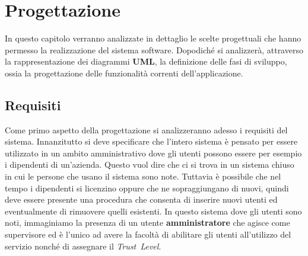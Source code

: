 \def \ti{\textit}
\def \bf{\textbf}

\chapter{Progettazione}
	\label{cap:progettazione}
	
    In questo capitolo verranno analizzate in dettaglio le scelte progettuali che hanno permesso la realizzazione del sistema software. Dopodiché si analizzerà, attraverso la rappresentazione dei diagrammi \textbf{UML}, la definizione delle fasi di sviluppo, ossia la progettazione delle funzionalità correnti dell'applicazione.

\section{Requisiti}
	\label{sec:requisiti}
	Come primo aspetto della progettazione si analizzeranno adesso i requisiti del sistema. Innanzitutto si deve specificare che l'intero sistema è pensato per essere utilizzato in un ambito amministrativo dove gli utenti possono essere per esempio i dipendenti di un'azienda. Questo vuol dire che ci si trova in un sistema chiuso in cui le persone che usano il sistema sono note. Tuttavia è possibile che nel tempo i dipendenti si licenzino oppure che ne sopraggiungano di nuovi, quindi deve essere presente una procedura che consenta di inserire nuovi utenti ed eventualmente di rimuovere quelli esistenti. In questo sistema dove gli utenti sono noti, immaginiamo la presenza di un utente \textbf{amministratore} che agisce come supervisore ed è l'unico ad avere la facoltà di abilitare gli utenti all'utilizzo del servizio nonché di assegnare il \emph{Trust~Level}.

